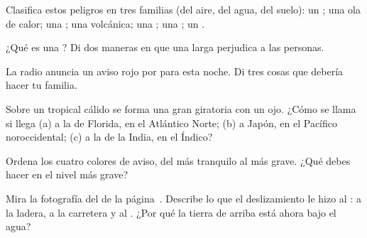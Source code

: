 \begin{exercise}[$\star$]\label{exo:g5:natural-hazards:2}
Clasifica estos peligros en tres familias (del aire, del agua, del suelo):
un ; una ola de calor; una ; una 
volcánica; una ; una ; un .
\end{exercise}

\begin{exercise}[$\star$]\label{exo:g5:natural-hazards:3}
¿Qué es una ? Di dos maneras en que una  larga perjudica a las personas.
\end{exercise}

\begin{exercise}[$\star$]\label{exo:g5:natural-hazards:4}
La radio anuncia un aviso rojo por  para esta noche. Di tres cosas
que debería hacer tu familia.
\end{exercise}

\begin{exercise}[$\star$]\label{exo:g5:natural-hazards:5}
Sobre un  tropical cálido se forma una gran  giratoria con un
ojo. ¿Cómo se llama si llega (a) a la  de Florida, en el Atlántico
Norte; (b) a Japón, en el Pacífico noroccidental; (c) a la  de la
India, en el  Índico?
\end{exercise}

\begin{exercise}[$\star$]\label{exo:g5:natural-hazards:6}
Ordena los cuatro colores de aviso, del más tranquilo al más grave. ¿Qué
debes hacer en el nivel más grave?
\end{exercise}

\begin{exercise}[$\star\star$]\label{exo:g5:natural-hazards:7}
Mira la fotografía del  de la
página~\pageref{fig:g5:natural-hazards:landslide}. Describe lo que el
deslizamiento le hizo al : a la ladera, a la carretera y al . ¿Por
qué la tierra de  arriba está ahora bajo el agua?
\end{exercise}

